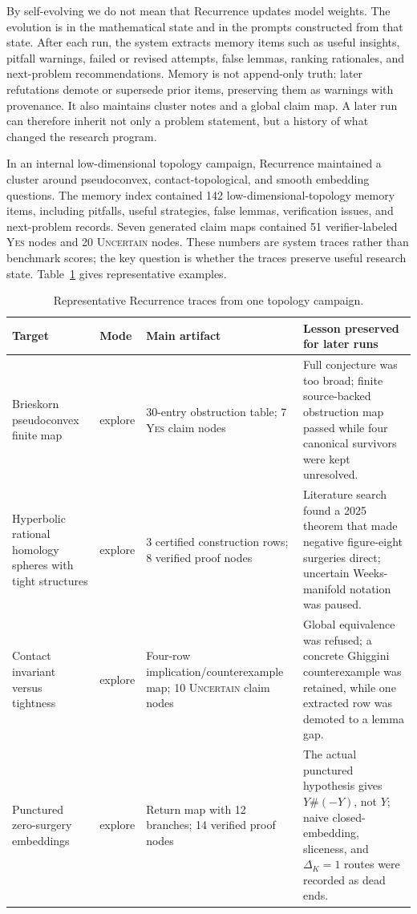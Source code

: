 \documentclass{article}
\theoremstyle{definition}
\theoremstyle{remark}
\begin{document}
By self-evolving we do not mean that Recurrence updates model weights. The evolution is in the mathematical state and in the prompts constructed from that state. After each run, the system extracts memory items such as useful insights, pitfall warnings, failed or revised attempts, false lemmas, ranking rationales, and next-problem recommendations. Memory is not append-only truth: later refutations demote or supersede prior items, preserving them as warnings with provenance. It also maintains cluster notes and a global claim map. A later run can therefore inherit not only a problem statement, but a history of what changed the research program.

In an internal low-dimensional topology campaign, Recurrence maintained a cluster around pseudoconvex, contact-topological, and smooth embedding questions. The memory index contained 142 low-dimensional-topology memory items, including pitfalls, useful strategies, false lemmas, verification issues, and next-problem records. Seven generated claim maps contained 51 verifier-labeled \textsc{Yes} nodes and 20 \textsc{Uncertain} nodes. These numbers are system traces rather than benchmark scores; the key question is whether the traces preserve useful research state. Table~\ref{tab:runs} gives representative examples.

\begin{table}[t]
  \caption{Representative Recurrence traces from one topology campaign.}
  \label{tab:runs}
  \vskip 0.08in
  \centering
  \begin{small}
  \begin{tabular}{p{}p{}p{}p{}}
    \toprule
    Target & Mode & Main artifact & Lesson preserved for later runs \\
    \midrule
    Brieskorn pseudoconvex finite map & explore & 30-entry obstruction table; 7 \textsc{Yes} claim nodes & Full conjecture was too broad; finite source-backed obstruction map passed while four canonical survivors were kept unresolved. \\
    Hyperbolic rational homology spheres with tight structures & explore & 3 certified construction rows; 8 verified proof nodes & Literature search found a 2025 theorem that made negative figure-eight surgeries direct; uncertain Weeks-manifold notation was paused. \\
    Contact invariant versus tightness & explore & Four-row implication/counterexample map; 10 \textsc{Uncertain} claim nodes & Global equivalence was refused; a concrete Ghiggini counterexample was retained, while one extracted row was demoted to a lemma gap. \\
    Punctured zero-surgery embeddings & explore & Return map with 12 branches; 14 verified proof nodes & The actual punctured hypothesis gives \(Y\#(-Y)\), not \(Y\); naive closed-embedding, sliceness, and \(\Delta_K=1\) routes were recorded as dead ends. \\
    \bottomrule
  \end{tabular}
  \end{small}
\end{table}
\end{document}
